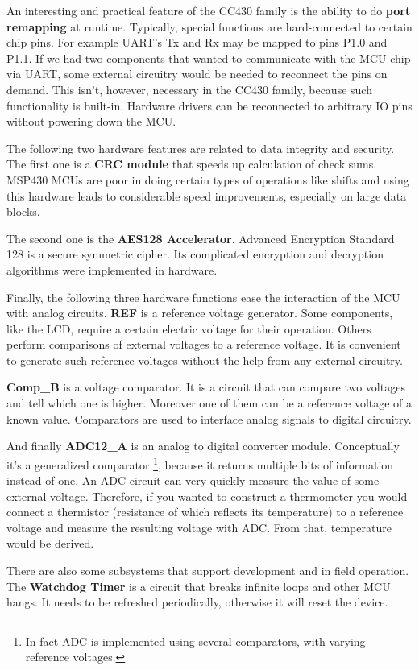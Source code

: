 An interesting and practical feature of the CC430 family is the
ability to do {\bf port remapping} at runtime. Typically, special
functions are hard-connected to certain chip pins. For example UART's
Tx and Rx may be mapped to pins P1.0 and P1.1. If we had two
components that wanted to communicate with the MCU chip via UART, some
external circuitry would be needed to reconnect the pins on demand.
This isn't, however, necessary in the CC430 family, because such
functionality is built-in. Hardware drivers can be reconnected to
arbitrary IO pins without powering down the MCU.

The following two hardware features are related to data integrity and
security. The first one is a {\bf CRC module} that speeds up
calculation of check sums.  MSP430 MCUs are poor in doing certain
types of operations like shifts and using this hardware leads to
considerable speed improvements, especially on large data blocks.

The second one is the {\bf AES128 Accelerator}. Advanced Encryption
Standard 128 is a secure symmetric cipher. Its complicated
encryption and decryption algorithms were implemented in hardware.

Finally, the following three hardware functions ease the interaction
of the MCU with analog circuits.  {\bf REF} is a reference voltage
generator. Some components, like the LCD, require a certain electric
voltage for their operation.  Others perform comparisons of external
voltages to a reference voltage. It is convenient to generate such
reference voltages without the help from any external circuitry.

{\bf Comp\_B} is a voltage comparator. It is a circuit that can
compare two voltages and tell which one is higher. Moreover one of
them can be a reference voltage of a known value. Comparators are used
to interface analog signals to digital circuitry.

And finally {\bf ADC12\_A} is an analog to digital converter
module. Conceptually it's a generalized comparator \footnote{In
fact ADC is implemented using several comparators, with varying
reference voltages.}, because it returns multiple bits of information
instead of one.  An ADC circuit can very quickly measure the value of
some external voltage. Therefore, if you wanted to construct a thermometer
you would connect a thermistor (resistance of which reflects its
temperature) to a reference voltage and measure the resulting
voltage with ADC. From that, temperature would be derived.

There are also some subsystems that support development and in field
operation. The {\bf Watchdog Timer} is a circuit that breaks infinite
loops and other MCU hangs. It needs to be refreshed periodically,
otherwise it will reset the device.

